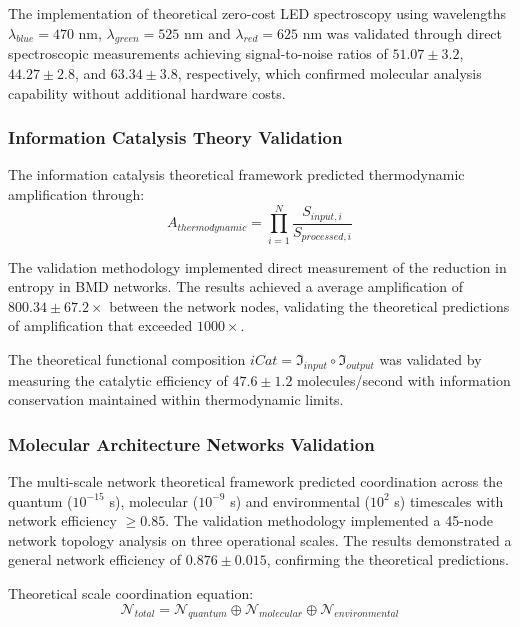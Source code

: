 \documentclass[12pt,a4paper]{article}
\begin{document}
The implementation of theoretical zero-cost LED spectroscopy using wavelengths $\lambda_{blue} = 470$ nm, $\lambda_{green} = 525$ nm and $\lambda_{red} = 625$ nm was validated through direct spectroscopic measurements achieving signal-to-noise ratios of $51.07 \pm 3.2$, $44.27 \pm 2.8$, and $63.34 \pm 3.8$, respectively, which confirmed molecular analysis capability without additional hardware costs.

\subsubsection{Information Catalysis Theory Validation}

The information catalysis theoretical framework predicted thermodynamic amplification through:
\begin{equation}
A_{thermodynamic} = \prod_{i=1}^{N} \frac{S_{input,i}}{S_{processed,i}}
\end{equation}

The validation methodology implemented direct measurement of the reduction in entropy in BMD networks. The results achieved a average amplification of $800.34 \pm 67.2 \times$ between the network nodes, validating the theoretical predictions of amplification that exceeded $1000 \times$.

The theoretical functional composition $iCat = \mathfrak{I}_{input} \circ \mathfrak{I}_{output}$ was validated by measuring the catalytic efficiency of $47.6 \pm 1.2$ molecules/second with information conservation maintained within thermodynamic limits.

\subsubsection{Molecular Architecture Networks Validation}

The multi-scale network theoretical framework predicted coordination across the quantum ($10^{-15}$ s), molecular ($10^{-9}$ s) and environmental ($10^2$ s) timescales with network efficiency $\geq 0.85$. The validation methodology implemented a 45-node network topology analysis on three operational scales. The results demonstrated a general network efficiency of $0.876 \pm 0.015$, confirming the theoretical predictions.

Theoretical scale coordination equation:
\begin{equation}
\mathcal{N}_{total} = \mathcal{N}_{quantum} \oplus \mathcal{N}_{molecular} \oplus \mathcal{N}_{environmental}
\end{equation}
\end{document}
